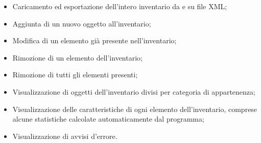 \begin{itemize}
  \item Caricamento ed esportazione dell'intero inventario da e su file XML;
  \item Aggiunta di un nuovo oggetto all'inventario;
  \item Modifica di un elemento già presente nell'inventario;
  \item Rimozione di un elemento dell'inventario;
  \item Rimozione di tutti gli elementi presenti;
  \item Visualizzazione di oggetti dell'inventario divisi per categoria di appartenenza;
  \item Visualizzazione delle caratteristiche di ogni elemento dell'inventario, comprese alcune statistiche calcolate automaticamente dal programma;
  \item Visualizzazione di avvisi d'errore.
\end{itemize}
